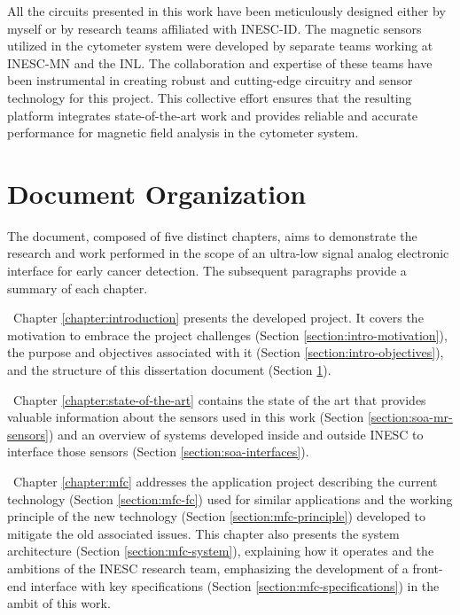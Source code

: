 All the circuits presented in this work have been meticulously designed either by myself or by research teams affiliated with \ac{INESC-ID}. The magnetic sensors utilized in the cytometer system were developed by separate teams working at \ac{INESC-MN} and the \ac{INL}. The collaboration and expertise of these teams have been instrumental in creating robust and cutting-edge circuitry and sensor technology for this project. This collective effort ensures that the resulting platform integrates state-of-the-art work and provides reliable and accurate performance for magnetic field analysis in the cytometer system.

\section{Document Organization}
\label{section:intro-document}

The document, composed of five distinct chapters, aims to demonstrate the research and work performed in the scope of an ultra-low signal analog electronic interface for early cancer detection. The subsequent paragraphs provide a summary of each chapter.

\noindent
\textbullet \, Chapter \ref{chapter:introduction} presents the developed project. It covers the motivation to embrace the project challenges (Section \ref{section:intro-motivation}), the purpose and objectives associated with it (Section \ref{section:intro-objectives}), and the structure of this dissertation document (Section \ref{section:intro-document}).

\noindent
\textbullet \, Chapter \ref{chapter:state-of-the-art} contains the state of the art that provides valuable information about the sensors used in this work (Section \ref{section:soa-mr-sensors}) and an overview of systems developed inside and outside \ac{INESC} to interface those sensors (Section \ref{section:soa-interfaces}).

\noindent
\textbullet \, Chapter \ref{chapter:mfc} addresses the application project describing the current technology (Section \ref{section:mfc-fc}) used for similar applications and the working principle of the new technology (Section \ref{section:mfc-principle}) developed to mitigate the old associated issues. This chapter also presents the system architecture (Section \ref{section:mfc-system}), explaining how it operates and the ambitions of the \ac{INESC} research team, emphasizing the development of a front-end interface with key specifications (Section \ref{section:mfc-specifications}) in the ambit of this work.

